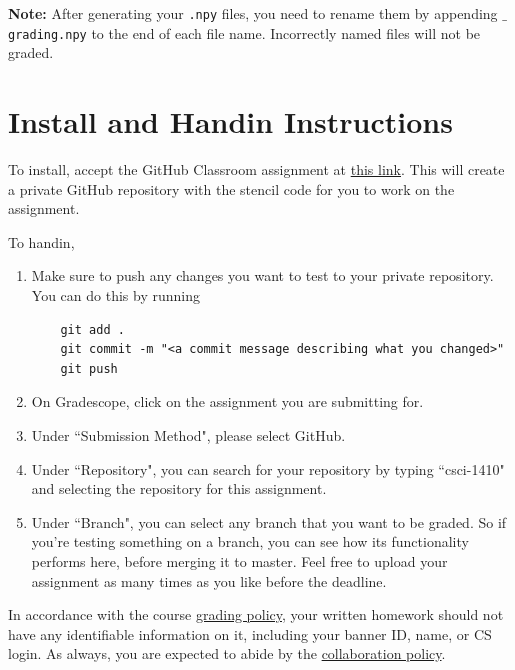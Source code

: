 \documentclass{article}
\begin{document}
\textbf{Note:} After generating your \texttt{.npy} files, you need to rename
them by appending \texttt{$\_$grading.npy} to the end of each file name.
Incorrectly named files will not be graded.


\section{Install and Handin Instructions}
To install, accept the GitHub Classroom assignment at \href{https://classroom.github.com/a/xiwOsTgg}{this link}. This will
create a private GitHub repository with the stencil code for you to work on the
assignment.

To handin,
\begin{enumerate}
  \item Make sure to push any changes you want to test to your private
    repository. You can do this by running
    \begin{verbatim}
    git add .
    git commit -m "<a commit message describing what you changed>"
    git push
    \end{verbatim}

  \item On Gradescope, click on the assignment you are submitting for.

  \item Under ``Submission Method", please select GitHub.

  \item Under ``Repository", you can search for your repository by typing ``csci-1410"
    and selecting the repository for this assignment.

  \item Under ``Branch", you can select any branch that you want to be graded. So if
    you're testing something on a branch, you can see how its functionality
    performs here, before merging it to master. Feel free to upload your assignment
    as many times as you like before the deadline.
\end{enumerate}

In accordance with the course \href {https://csci1410-2022.vercel.app/files/resources/CS1410_grading_policy.pdf}{grading policy},
your written homework should not have any identifiable information on it,
including your banner ID, name, or CS login. As always, you are expected to abide by the \href{https://csci1410-2022.vercel.app/files/resources/Collaboration_Policy.pdf}{collaboration policy}.
\end{document}
